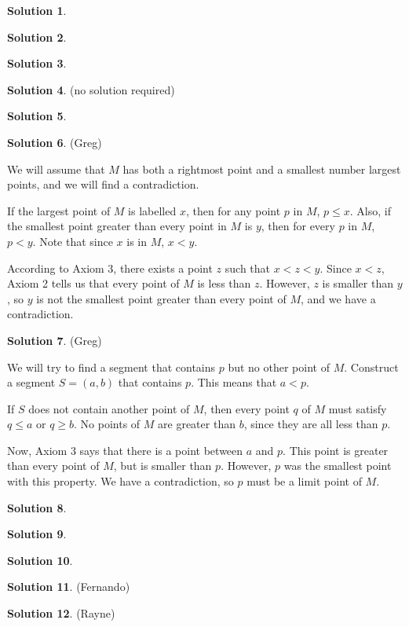 \documentclass{article}
\theoremstyle{definition}
\newtheorem{solution}{Solution}
\begin{document}
\begin{solution} %
\end{solution}

\begin{solution} %
\end{solution}

\begin{solution} %
\end{solution}

\begin{solution} %
(no solution required)
\end{solution}

\begin{solution} %
\end{solution}

\begin{solution} %
(Greg)

We will assume that $M$ has both a rightmost point and a smallest number largest points, and we will find a contradiction.

If the largest point of $M$ is labelled $x$, then for any point $p$ in $M$, $p \leq x$.
Also, if the smallest point greater than every point in $M$ is $y$, then for every $p$ in $M$, $p < y$.
Note that since $x$ is in $M$, $x < y$.

According to Axiom 3, there exists a point $z$ such that $x < z < y$.
Since $x < z$, Axiom 2 tells us that every point of $M$ is less than $z$.
However, $z$ is smaller than $y$, so $y$ is not the smallest point greater than every point of $M$, and we have a contradiction.
\end{solution}

\begin{solution} %
(Greg)

We will try to find a segment that contains $p$ but no other point of $M$.
Construct a segment $S = (a,b)$ that contains $p$.
This means that $a < p$.

If $S$ does not contain another point of $M$, then every point $q$ of $M$ must satisfy $q \leq a$ or $q \geq b$.
No points of $M$ are greater than $b$, since they are all less than $p$.

Now, Axiom 3 says that there is a point between $a$ and $p$.
This point is greater than every point of $M$, but is smaller than $p$. 
However, $p$ was the smallest point with this property.
We have a contradiction, so $p$ must be a limit point of $M$.
\end{solution}

\begin{solution} %
\end{solution}

\begin{solution} %
\end{solution}

\begin{solution} %
\end{solution}

\begin{solution} %
(Fernando)
\end{solution}

\begin{solution} %
(Rayne)
\end{solution}
\end{document}
